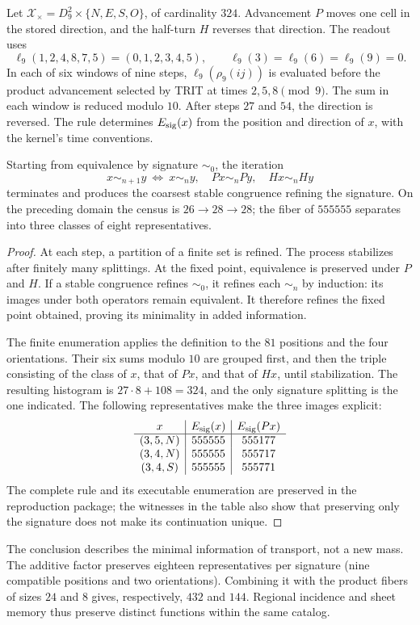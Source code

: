 \begin{definition}
\label{def:firma555}
Let \(\mathcal X_\times=D_9^2\times\{N,E,S,O\}\), of cardinality \(324\).
Advancement \(P\) moves one cell in the stored direction, and the half-turn
\(H\) reverses that direction. The readout uses
\[
\ell_9(1,2,4,8,7,5)=(0,1,2,3,4,5),\qquad
\ell_9(3)=\ell_9(6)=\ell_9(9)=0.
\]
In each of six windows of nine steps,
\(\ell_9(\rho_9(ij))\) is evaluated before the product advancement selected by TRIT at
times \(2,5,8\pmod9\). The sum in each window is reduced modulo
\(10\). After steps \(27\) and \(54\), the direction is reversed.
The rule determines \(E_{\rm sig}(x)\) from the position and direction
of \(x\), with the kernel's time conventions.
\end{definition}

\begin{proposition}
\label{prop:firma555}
Starting from equivalence by signature \(\sim_0\), the iteration
\[
x\sim_{n+1}y\ \Longleftrightarrow\
x\sim_n y,\quad Px\sim_n Py,\quad Hx\sim_n Hy
\]
terminates and produces the coarsest stable congruence refining the signature.
On the preceding domain the census is \(26\to28\to28\); the fiber of
\(555555\) separates into three classes of eight representatives.
\end{proposition}
\begin{proof}
At each step, a partition of a finite set is refined. The process
stabilizes after finitely many splittings. At the fixed point,
equivalence is preserved under \(P\) and \(H\). If a stable congruence
refines \(\sim_0\), it refines each \(\sim_n\) by induction: its images
under both operators remain equivalent. It therefore refines the fixed
point obtained, proving its minimality in added information.

The finite enumeration applies the definition to the \(81\) positions and the
four orientations. Their six sums modulo \(10\) are grouped first, and
then the triple consisting of the class of \(x\), that of \(Px\), and that of
\(Hx\), until stabilization. The resulting histogram is
\(27\cdot8+108=324\), and the only signature splitting is the one indicated.
The following representatives make the three images explicit:
\[
\begin{array}{c|c|c}
x&E_{\rm sig}(x)&E_{\rm sig}(Px)\\\hline
(3,5,N)&555555&555177\\
(3,4,N)&555555&555717\\
(3,4,S)&555555&555771
\end{array}
\]
The complete rule and its executable enumeration are preserved in the
reproduction package; the witnesses in the table also show that preserving
only the signature does not make its continuation unique.
\end{proof}

The conclusion describes the minimal information of transport, not a
new mass. The additive factor preserves eighteen representatives per signature
(nine compatible positions and two orientations). Combining it with the
product fibers of sizes \(24\) and \(8\) gives, respectively,
\(432\) and \(144\). Regional incidence and sheet memory thus preserve
distinct functions within the same catalog.
